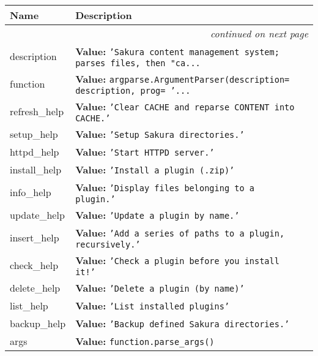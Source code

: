     \vspace{-1cm}
\hspace{\varindent}\begin{longtable}{|p{\varnamewidth}|p{\vardescrwidth}|l}
\cline{1-2}
\cline{1-2} \centering \textbf{Name} & \centering \textbf{Description}& \\
\cline{1-2}
\endhead\cline{1-2}\multicolumn{3}{r}{\small\textit{continued on next page}}\\\endfoot\cline{1-2}
\endlastfoot\raggedright d\-e\-s\-c\-r\-i\-p\-t\-i\-o\-n\- & \raggedright \textbf{Value:} 
{\tt 'Sakura content management system; parses files, then "ca\texttt{...}}&\\
\cline{1-2}
\raggedright f\-u\-n\-c\-t\-i\-o\-n\- & \raggedright \textbf{Value:} 
{\tt argparse.ArgumentParser(description= description, prog= '\texttt{...}}&\\
\cline{1-2}
\raggedright r\-e\-f\-r\-e\-s\-h\-\_\-h\-e\-l\-p\- & \raggedright \textbf{Value:} 
{\tt 'Clear CACHE and reparse CONTENT into CACHE.'}&\\
\cline{1-2}
\raggedright s\-e\-t\-u\-p\-\_\-h\-e\-l\-p\- & \raggedright \textbf{Value:} 
{\tt 'Setup Sakura directories.'}&\\
\cline{1-2}
\raggedright h\-t\-t\-p\-d\-\_\-h\-e\-l\-p\- & \raggedright \textbf{Value:} 
{\tt 'Start HTTPD server.'}&\\
\cline{1-2}
\raggedright i\-n\-s\-t\-a\-l\-l\-\_\-h\-e\-l\-p\- & \raggedright \textbf{Value:} 
{\tt 'Install a plugin (.zip)'}&\\
\cline{1-2}
\raggedright i\-n\-f\-o\-\_\-h\-e\-l\-p\- & \raggedright \textbf{Value:} 
{\tt 'Display files belonging to a plugin.'}&\\
\cline{1-2}
\raggedright u\-p\-d\-a\-t\-e\-\_\-h\-e\-l\-p\- & \raggedright \textbf{Value:} 
{\tt 'Update a plugin by name.'}&\\
\cline{1-2}
\raggedright i\-n\-s\-e\-r\-t\-\_\-h\-e\-l\-p\- & \raggedright \textbf{Value:} 
{\tt 'Add a series of paths to a plugin, recursively.'}&\\
\cline{1-2}
\raggedright c\-h\-e\-c\-k\-\_\-h\-e\-l\-p\- & \raggedright \textbf{Value:} 
{\tt 'Check a plugin before you install it!'}&\\
\cline{1-2}
\raggedright d\-e\-l\-e\-t\-e\-\_\-h\-e\-l\-p\- & \raggedright \textbf{Value:} 
{\tt 'Delete a plugin (by name)'}&\\
\cline{1-2}
\raggedright l\-i\-s\-t\-\_\-h\-e\-l\-p\- & \raggedright \textbf{Value:} 
{\tt 'List installed plugins'}&\\
\cline{1-2}
\raggedright b\-a\-c\-k\-u\-p\-\_\-h\-e\-l\-p\- & \raggedright \textbf{Value:} 
{\tt 'Backup defined Sakura directories.'}&\\
\cline{1-2}
\raggedright a\-r\-g\-s\- & \raggedright \textbf{Value:} 
{\tt function.parse\_args()}&\\
\cline{1-2}
\end{longtable}


